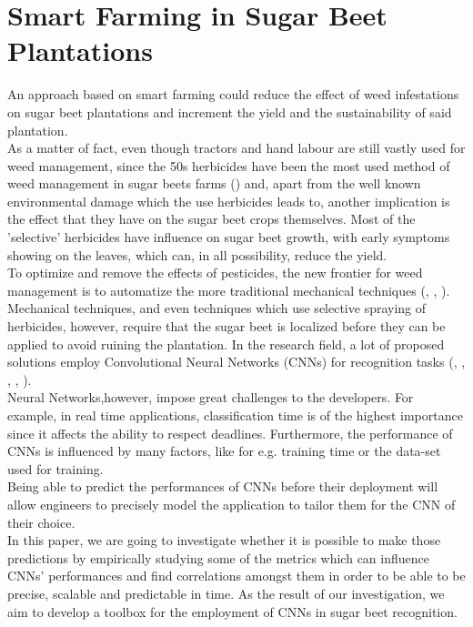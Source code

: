 \section{Smart Farming in Sugar Beet Plantations}
An approach based on smart farming could reduce the effect of weed infestations on sugar beet plantations and  increment the yield and the sustainability of said plantation.\\
As a matter of fact, even though tractors and hand labour are still vastly used for weed management, since the 50s herbicides have been the most used method of weed management in sugar beets farms (\cite{cioni_weed_2010}) and, apart from the well known environmental damage which the use herbicides leads to, another implication is the effect that they have on the sugar beet crops themselves. Most of the 'selective' herbicides have influence on sugar beet growth, with early symptoms showing on the leaves, which can, in all possibility, reduce the yield. \cite{petersen_review_2004}\\
To optimize and remove the effects of pesticides, the new frontier for weed management is to automatize the more traditional mechanical techniques (\cite{raja_real-time_2020}, \cite{frasconi_design_2014}, \cite{machleb_sensor-based_2021}).\\
Mechanical techniques, and even techniques which use selective spraying of herbicides, however, require that the sugar beet is localized before they can be applied to avoid ruining the plantation. In the research field, a lot of proposed solutions employ Convolutional Neural Networks (CNNs) for recognition tasks (\cite{gao_deep_2020}, \cite{suh_transfer_2018}, \cite{ramirez_deep_2020},  \cite{milioto2017real}, \cite{agriculture11111111}).\\
Neural Networks,however, impose great challenges to the developers. For example, in real time applications, classification time is of the highest importance since it affects the ability to respect deadlines. Furthermore, the performance of CNNs is influenced by many factors, like for e.g. training time or the data-set used for training.\\ %
Being able to predict the performances of CNNs before their deployment will allow engineers to precisely model the application to tailor them for the CNN of their choice. \\
In this paper, we are going to investigate whether it is possible to make those predictions by empirically studying some of the metrics which can influence CNNs' performances and find correlations amongst them in order to be able to be precise, scalable and predictable in time. As the result of our investigation, we aim to develop a toolbox for the employment of CNNs in sugar beet recognition.

